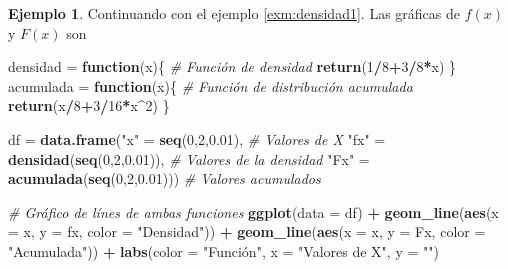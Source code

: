 \documentclass[
  11pt,
]{book}
\newenvironment{Shaded}{\begin{snugshade}}{\end{snugshade}}
\newcommand{\AttributeTok}[1]{\textcolor[rgb]{0.13,0.29,0.53}{#1}}
\newcommand{\CommentTok}[1]{\textcolor[rgb]{0.56,0.35,0.01}{\textit{#1}}}
\newcommand{\ControlFlowTok}[1]{\textcolor[rgb]{0.13,0.29,0.53}{\textbf{#1}}}
\newcommand{\DecValTok}[1]{\textcolor[rgb]{0.00,0.00,0.81}{#1}}
\newcommand{\FloatTok}[1]{\textcolor[rgb]{0.00,0.00,0.81}{#1}}
\newcommand{\FunctionTok}[1]{\textcolor[rgb]{0.13,0.29,0.53}{\textbf{#1}}}
\newcommand{\NormalTok}[1]{#1}
\newcommand{\OtherTok}[1]{\textcolor[rgb]{0.56,0.35,0.01}{#1}}
\newcommand{\SpecialCharTok}[1]{\textcolor[rgb]{0.81,0.36,0.00}{\textbf{#1}}}
\newcommand{\StringTok}[1]{\textcolor[rgb]{0.31,0.60,0.02}{#1}}
\theoremstyle{definition}
\theoremstyle{definition}
\newtheorem{example}{Ejemplo}[chapter]
\theoremstyle{definition}
\theoremstyle{definition}
\theoremstyle{remark}
\begin{document}
\begin{example}
Continuando con el ejemplo \ref{exm:densidad1}. Las gráficas de \(f(x)\) y \(F(x)\) son

\begin{Shaded}
\begin{Highlighting}[]
\NormalTok{densidad }\OtherTok{=} \ControlFlowTok{function}\NormalTok{(x)\{ }\CommentTok{\# Función de densidad}
  \FunctionTok{return}\NormalTok{(}\DecValTok{1}\SpecialCharTok{/}\DecValTok{8}\SpecialCharTok{+}\DecValTok{3}\SpecialCharTok{/}\DecValTok{8}\SpecialCharTok{*}\NormalTok{x)}
\NormalTok{\}}
\NormalTok{acumulada }\OtherTok{=} \ControlFlowTok{function}\NormalTok{(x)\{ }\CommentTok{\# Función de distribución acumulada}
  \FunctionTok{return}\NormalTok{(x}\SpecialCharTok{/}\DecValTok{8}\SpecialCharTok{+}\DecValTok{3}\SpecialCharTok{/}\DecValTok{16}\SpecialCharTok{*}\NormalTok{x}\SpecialCharTok{\^{}}\DecValTok{2}\NormalTok{)}
\NormalTok{\}}

\NormalTok{df }\OtherTok{=} \FunctionTok{data.frame}\NormalTok{(}\StringTok{"x"} \OtherTok{=} \FunctionTok{seq}\NormalTok{(}\DecValTok{0}\NormalTok{,}\DecValTok{2}\NormalTok{,}\FloatTok{0.01}\NormalTok{), }\CommentTok{\# Valores de X}
                \StringTok{"fx"} \OtherTok{=} \FunctionTok{densidad}\NormalTok{(}\FunctionTok{seq}\NormalTok{(}\DecValTok{0}\NormalTok{,}\DecValTok{2}\NormalTok{,}\FloatTok{0.01}\NormalTok{)), }\CommentTok{\# Valores de la densidad}
                \StringTok{"Fx"} \OtherTok{=} \FunctionTok{acumulada}\NormalTok{(}\FunctionTok{seq}\NormalTok{(}\DecValTok{0}\NormalTok{,}\DecValTok{2}\NormalTok{,}\FloatTok{0.01}\NormalTok{))) }\CommentTok{\# Valores acumulados}

\CommentTok{\# Gráfico de línes de ambas funciones}
\FunctionTok{ggplot}\NormalTok{(}\AttributeTok{data =}\NormalTok{ df) }\SpecialCharTok{+}
  \FunctionTok{geom\_line}\NormalTok{(}\FunctionTok{aes}\NormalTok{(}\AttributeTok{x =}\NormalTok{ x, }\AttributeTok{y =}\NormalTok{ fx, }\AttributeTok{color =} \StringTok{"Densidad"}\NormalTok{)) }\SpecialCharTok{+}
  \FunctionTok{geom\_line}\NormalTok{(}\FunctionTok{aes}\NormalTok{(}\AttributeTok{x =}\NormalTok{ x, }\AttributeTok{y =}\NormalTok{ Fx, }\AttributeTok{color =} \StringTok{"Acumulada"}\NormalTok{)) }\SpecialCharTok{+}
  \FunctionTok{labs}\NormalTok{(}\AttributeTok{color =} \StringTok{"Función"}\NormalTok{, }\AttributeTok{x =} \StringTok{"Valores de X"}\NormalTok{, }\AttributeTok{y =} \StringTok{""}\NormalTok{)}
\end{Highlighting}
\end{Shaded}


\end{example}
\end{document}
